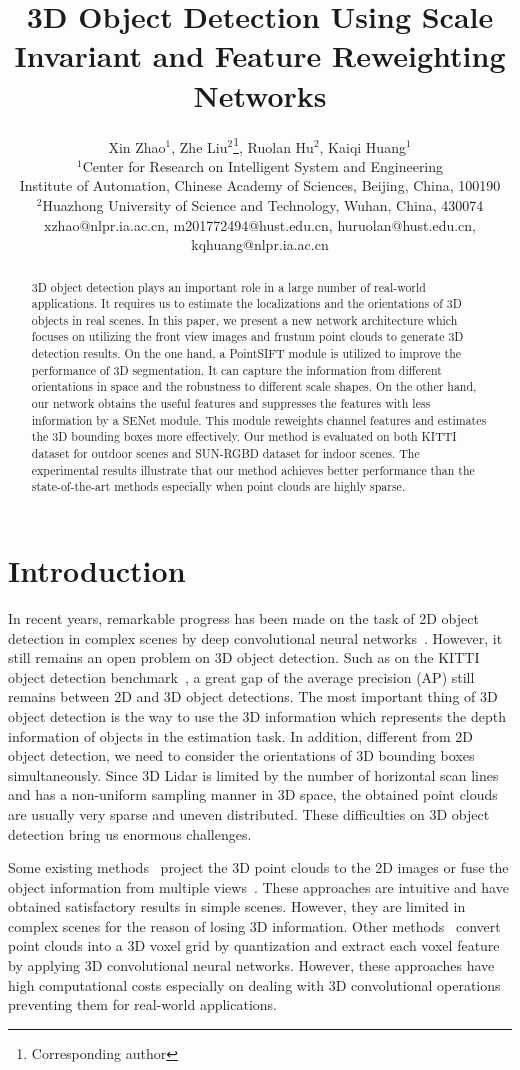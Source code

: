 \documentclass[letterpaper]{article} %
\title{3D Object Detection Using Scale Invariant and Feature Reweighting Networks}
\author{Xin Zhao$^1$, Zhe Liu$^{2}$\thanks{Corresponding author}, Ruolan Hu$^2$, Kaiqi Huang$^1$\\
$^1$Center for Research on Intelligent System and Engineering\\
Institute of Automation, Chinese Academy of Sciences, Beijing, China, 100190\\
$^2$Huazhong University of Science and Technology, Wuhan, China, 430074\\
xzhao@nlpr.ia.ac.cn, m201772494@hust.edu.cn, huruolan@hust.edu.cn, kqhuang@nlpr.ia.ac.cn\\
}
\begin{document}
\maketitle
\begin{abstract}
3D object detection plays an important role in a large number of real-world applications. It requires us to estimate the localizations and the orientations of 3D objects in real scenes. In this paper, we present a new network architecture which focuses on utilizing the front view images and frustum point clouds to generate 3D detection results. On the one hand, a PointSIFT module is utilized to improve the performance of 3D segmentation. It can capture the information from different orientations in space and the robustness to different scale shapes. On the other hand, our network obtains the useful features and suppresses the features with less information by a SENet module. This module reweights channel features and estimates the 3D bounding boxes more effectively. Our method is evaluated on both KITTI dataset for outdoor scenes and SUN-RGBD dataset for indoor scenes. The experimental results illustrate that our method achieves better performance than the state-of-the-art methods especially when point clouds are highly sparse.
\end{abstract}


\section{Introduction}
In recent years, remarkable progress has been made on the task of 2D object detection in complex scenes by deep convolutional neural networks~\cite{girshick2015fast,redmon2016you,liu2016ssd}. However, it still remains an open problem on 3D object detection. Such as on the KITTI object detection benchmark~\cite{geiger2012we}, a great gap of the average precision (AP) still remains between 2D and 3D object detections. The most important thing of 3D object detection is the way to use the 3D information which represents the depth information of objects in the estimation task. In addition, different from 2D object detection, we need to consider the orientations of 3D bounding boxes simultaneously. Since 3D Lidar is limited by the number of horizontal scan lines and has a non-uniform sampling manner in 3D space, the obtained point clouds are usually very sparse and uneven distributed. These difficulties on 3D object detection bring us enormous challenges.

%
Some existing methods~\cite{li2016vehicle,wang2017fusing} project the 3D point clouds to the 2D images or fuse the object information from multiple views~\cite{su2015multi,rubino20183d}. These approaches are intuitive and have obtained satisfactory results in simple scenes. However, they are limited in complex scenes for the reason of losing 3D information. Other methods~\cite{engelcke2017vote3deep,maturana2015voxnet} convert point clouds into a 3D voxel grid by quantization and extract each voxel feature by applying 3D convolutional neural networks. However, these approaches have high computational costs especially on dealing with 3D convolutional operations preventing them for real-world applications.
\end{document}
